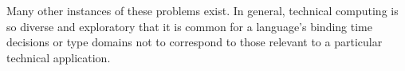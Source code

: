 \documentclass[12pt]{article}
\begin{document}
Many other instances of these problems exist. In general, technical
computing is so diverse and exploratory that it is common for a language's
binding time decisions or type domains not to correspond to those
relevant to a particular technical application.

\newpage



\end{document}
